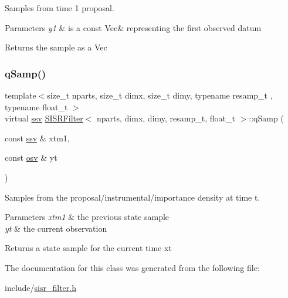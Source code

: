 Samples from time 1 proposal. 


\begin{DoxyParams}{Parameters}
{\em y1} & is a const Vec\& representing the first observed datum \\
\hline
\end{DoxyParams}
\begin{DoxyReturn}{Returns}
the sample as a Vec 
\end{DoxyReturn}
\mbox{\label{classSISRFilter_a609bb361da16e1b24ebfab693620241b}} 
\subsubsection{\texorpdfstring{q\+Samp()}{qSamp()}}
{\footnotesize\ttfamily template$<$size\+\_\+t nparts, size\+\_\+t dimx, size\+\_\+t dimy, typename resamp\+\_\+t , typename float\+\_\+t $>$ \\
virtual \hyperlink{classSISRFilter_abfec45cf57ea6fadae4a9da8b0042351}{ssv} \hyperlink{classSISRFilter}{S\+I\+S\+R\+Filter}$<$ nparts, dimx, dimy, resamp\+\_\+t, float\+\_\+t $>$\+::q\+Samp (\begin{DoxyParamCaption}\item[{const \hyperlink{classSISRFilter_abfec45cf57ea6fadae4a9da8b0042351}{ssv} \&}]{xtm1,  }\item[{const \hyperlink{classSISRFilter_a5b762e9352857a9e48db3932191887ef}{osv} \&}]{yt }\end{DoxyParamCaption})\hspace{0.3cm}{\ttfamily [pure virtual]}}



Samples from the proposal/instrumental/importance density at time t. 


\begin{DoxyParams}{Parameters}
{\em xtm1} & the previous state sample \\
\hline
{\em yt} & the current observation \\
\hline
\end{DoxyParams}
\begin{DoxyReturn}{Returns}
a state sample for the current time xt 
\end{DoxyReturn}


The documentation for this class was generated from the following file\+:\begin{DoxyCompactItemize}
\item 
include/\hyperlink{sisr__filter_8h}{sisr\+\_\+filter.\+h}\end{DoxyCompactItemize}
